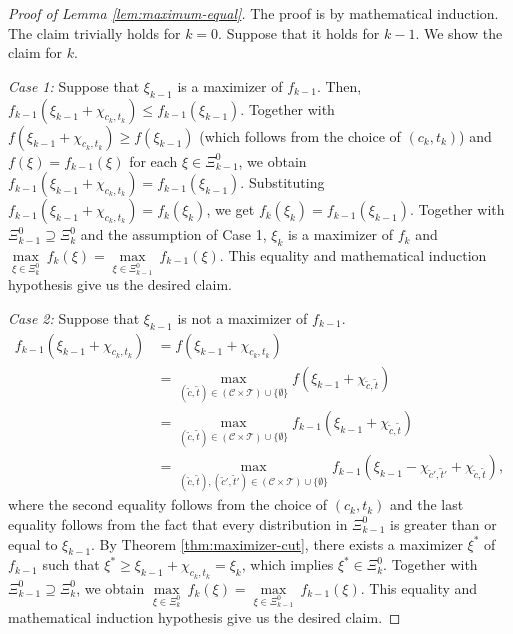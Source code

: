 \documentclass[12pt]{amsart}
\theoremstyle{remark}
\begin{document}
\begin{proof}[Proof of Lemma \ref{lem:maximum-equal}]\renewcommand{\qedsymbol}{$\blacksquare$}
The proof is by mathematical induction. The claim trivially holds for $k=0$. Suppose that it holds for $k-1$. We show the claim for $k$.

\smallskip
\noindent
\emph{Case 1:}
Suppose that $\xi_{k-1}$ is a maximizer of $f_{k-1}$. Then, $f_{k-1}(\xi_{k-1}+\chi_{c_{k}, t_{k}})\leq f_{k-1}(\xi_{k-1})$. Together with $f(\xi_{k-1}+\chi_{c_{k}, t_{k}})\geq f(\xi_{k-1})$ (which follows from the choice of $(c_{k}, t_{k})$) and $f(\xi)=f_{k-1}(\xi)$ for each $\xi\in \Xi^0_{k-1}$, we obtain $f_{k-1}(\xi_{k-1}+\chi_{c_{k}, t_{k}})=f_{k-1}(\xi_{k-1})$. Substituting $f_{k-1}(\xi_{k-1}+\chi_{c_{k}, t_{k}})=f_k(\xi_k)$, we get $f_k(\xi_k)=f_{k-1}(\xi_{k-1})$. Together with $\Xi^0_{k-1}\supseteq \Xi^0_k$ and the assumption of Case 1, $\xi_k$ is a maximizer of $f_k$ and $\underset {\xi\in \Xi^0_k} {\max} \: f_k(\xi)=\underset {\xi\in \Xi^0_{k-1}} {\max} \: f_{k-1}(\xi)$. This equality and mathematical induction hypothesis give us the desired claim.

\smallskip
\noindent
\emph{Case 2:}
Suppose that $\xi_{k-1}$ is not a maximizer of $f_{k-1}$.
\begin{align*}
f_{k-1}(\xi_{k-1}+\chi_{c_{k}, t_{k}})&=f(\xi_{k-1}+\chi_{c_{k}, t_{k}}) \\
&= \max_{(\tilde c,\tilde t) \in (\mathcal C \times \mathcal T)\cup\{\emptyset\}}  f(\xi_{k-1}+\chi_{\tilde c, \tilde t}) \\
&=\max_{(\tilde c,\tilde t) \in (\mathcal C \times \mathcal T)\cup\{\emptyset\}}  f_{k-1}(\xi_{k-1}+\chi_{\tilde c, \tilde t}) \\
&= \max_{(\tilde c,\tilde t), (\tilde c',\tilde t') \in (\mathcal C \times \mathcal T) \cup \{\emptyset\}} f_{k-1}(\xi_{k-1}-\chi_{\tilde c',\tilde t'}+\chi_{\tilde c,\tilde t}),
\end{align*}
where the second equality follows from the choice of $(c_{k}, t_{k})$ and the last equality follows from the fact that every distribution in $\Xi^0_{k-1}$ is greater than or equal to $\xi_{k-1}$.
By Theorem \ref{thm:maximizer-cut}, there exists a maximizer $\xi^*$ of $f_{k-1}$ such that $\xi^* \geq \xi_{k-1}+\chi_{c_{k}, t_{k}}=\xi_k$, which implies $\xi^*\in \Xi^0_k$. Together with $\Xi^0_{k-1}\supseteq \Xi^0_k$, we obtain $\underset {\xi\in \Xi^0_k} {\max} \: f_k(\xi)=\underset {\xi\in \Xi^0_{k-1}} {\max} \: f_{k-1}(\xi)$. This equality and mathematical induction hypothesis give us the desired claim.
\end{proof}
\end{document}
